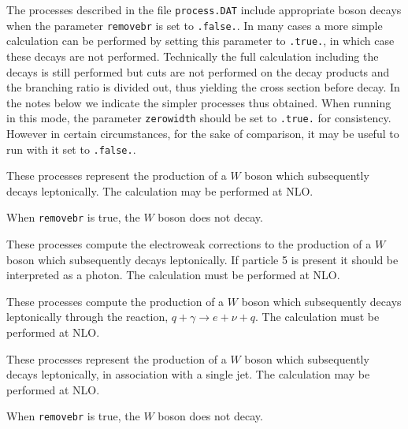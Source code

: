 
\label{sec:specific}

The processes described in the file {\tt process.DAT} include appropriate boson decays when the parameter 
{\tt removebr} is set to {\tt .false.}. In many cases a more simple calculation can be performed by setting 
this parameter to {\tt .true.}, in which case these decays are not performed.
Technically the full calculation including the decays
is still performed but cuts are not performed on the decay products and the
branching ratio is divided out, thus yielding the cross section before decay.
In the notes below we indicate the simpler processes thus obtained. When running in
this mode, the parameter {\tt zerowidth} should be set to {\tt .true.} for consistency. However in certain 
circumstances, for the sake of comparison, it may be useful to run with it set to {\tt .false.}.

\label{subsec:wboson}

These processes represent the production of a $W$ boson which subsequently
decays leptonically. The calculation may be performed at NLO.

When {\tt removebr} is true, the $W$ boson does not decay.

\label{subsec:wbosonew}

These processes compute the electroweak corrections to the production of
a $W$ boson which subsequently decays leptonically.  If particle 5 is present
it should be interpreted as a photon.
The calculation must be performed at NLO.

\label{subsec:wbosonphoton}

These processes compute the production of
a $W$ boson which subsequently decays leptonically through the reaction,
$q + \gamma \to e + \nu + q$.
The calculation must be performed at NLO.

\label{subsec:w1jet}

These processes represent the production of a $W$ boson which subsequently
decays leptonically, in association with a single jet.
The calculation may be performed at NLO.

When {\tt removebr} is true, the $W$ boson does not decay.

\label{subsec:wb}

